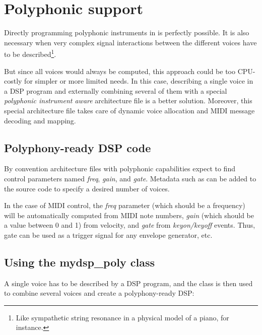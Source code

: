 \chapter{Polyphonic support} 
\label{poly}

Directly programming polyphonic instruments in \faust is perfectly possible. It is also necessary when very complex signal interactions between the different voices have to be described\footnote{Like sympathetic string resonance in a physical model of a piano, for instance.}.

But since all voices would always be computed, this approach could be too CPU-costly for simpler or more limited needs. In this case, describing a single voice in a \faust DSP program and externally combining several of them with a special  {\it polyphonic instrument aware} architecture file is a better solution. Moreover, this special architecture file takes care of dynamic voice allocation and MIDI message decoding and mapping.

\section{Polyphony-ready DSP code}

By convention \faust architecture files with polyphonic capabilities expect to find control parameters named {\it freq}, {\it gain}, and {\it gate}.  Metadata such as  can be added to the source code to specify a desired number of voices.

In the case of MIDI control, the {\it freq} parameter (which should be a frequency) will be automatically computed from MIDI note numbers, {\it gain} (which should be a value between 0 and 1) from velocity, and {\it gate} from {\it keyon/keyoff} events. Thus, gate can be used as a trigger signal for any envelope generator, etc.

\section{Using the mydsp\_poly class}

A single voice has to be described by a \faust DSP program, and the  class is then used to combine several voices and create a polyphony-ready DSP:

